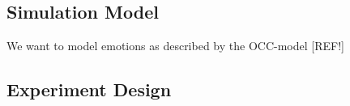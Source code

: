 \subsection*{Simulation Model}
We want to model emotions as described by the OCC-model [REF!] 
\subsection*{Experiment Design}

